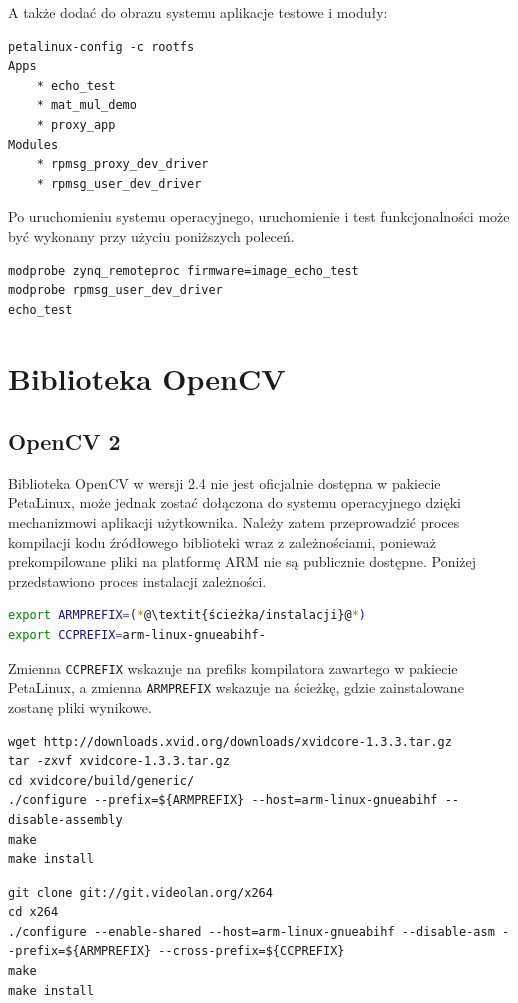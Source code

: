 A także dodać do obrazu systemu aplikacje testowe i moduły:
\begin{lstlisting}
petalinux-config -c rootfs
Apps
	* echo_test
	* mat_mul_demo
	* proxy_app
Modules
	* rpmsg_proxy_dev_driver
	* rpmsg_user_dev_driver
\end{lstlisting}

Po uruchomieniu systemu operacyjnego, uruchomienie i test funkcjonalności może być wykonany przy użyciu poniższych poleceń.

\begin{lstlisting}
modprobe zynq_remoteproc firmware=image_echo_test
modprobe rpmsg_user_dev_driver
echo_test
\end{lstlisting}

\section{Biblioteka OpenCV}
\label{sec:opencv-config}
\subsection{OpenCV 2}
Biblioteka OpenCV w wersji 2.4 nie jest oficjalnie dostępna w pakiecie PetaLinux, może jednak zostać dołączona do systemu operacyjnego dzięki mechanizmowi aplikacji użytkownika.
Należy zatem przeprowadzić proces kompilacji kodu źródłowego biblioteki wraz z zależnościami, ponieważ prekompilowane pliki na platformę ARM nie są publicznie dostępne. Poniżej przedstawiono proces instalacji zależności.

\begin{lstlisting}[breaklines=true, language=Bash, caption=Definicje zmiennych środowiskowych.]
export ARMPREFIX=(*@\textit{ścieżka/instalacji}@*)
export CCPREFIX=arm-linux-gnueabihf-
\end{lstlisting}

Zmienna \texttt{CCPREFIX} wskazuje na prefiks kompilatora zawartego w pakiecie PetaLinux, a zmienna \texttt{ARMPREFIX} wskazuje na ścieżkę, gdzie zainstalowane zostanę pliki wynikowe.

\begin{lstlisting}[breaklines=true, caption=Kompilacja biblioteki \textit{xVideo}.]
wget http://downloads.xvid.org/downloads/xvidcore-1.3.3.tar.gz
tar -zxvf xvidcore-1.3.3.tar.gz
cd xvidcore/build/generic/
./configure --prefix=${ARMPREFIX} --host=arm-linux-gnueabihf --disable-assembly
make
make install
\end{lstlisting}

\begin{lstlisting}[breaklines=true, caption=Kompilacja biblioteki \textit{x264}.]
git clone git://git.videolan.org/x264
cd x264
./configure --enable-shared --host=arm-linux-gnueabihf --disable-asm --prefix=${ARMPREFIX} --cross-prefix=${CCPREFIX}
make
make install
\end{lstlisting}

